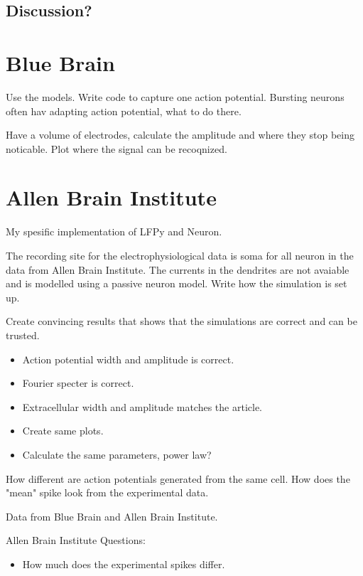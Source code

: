 \documentclass[altfont, fleqn]{uiophd}
\begin{document}
\subsection{Discussion?}

\section{Blue Brain}
Use the models. Write code to capture one action potential. Bursting neurons
often hav adapting action potential, what to do there. 

Have a volume of electrodes, calculate the amplitude and where they stop being 
noticable. Plot where the signal can be recoqnized. 

\section{Allen Brain Institute}

My spesific implementation of LFPy and Neuron. 

The recording site for the electrophysiological data is soma for all neuron in the data from 
Allen Brain Institute.
The currents in the dendrites are not avaiable and is modelled using a passive neuron model.
Write how the simulation is set up. 


Create convincing results that shows that the simulations are correct and can be trusted. 

\begin{itemize}
	\item Action potential width and amplitude is correct. 
	\item Fourier specter is correct. 
	\item Extracellular width and amplitude matches the article. 
	\item Create same plots. 
	\item Calculate the same parameters, power law?
\end{itemize}

How different are action potentials generated from the same cell. How does the "mean" spike look
from the experimental data. 

Data from Blue Brain and Allen Brain Institute. 

Allen Brain Institute Questions:
\begin{itemize}
	\item How much does the experimental spikes differ. 
\end{itemize}
\end{document}
